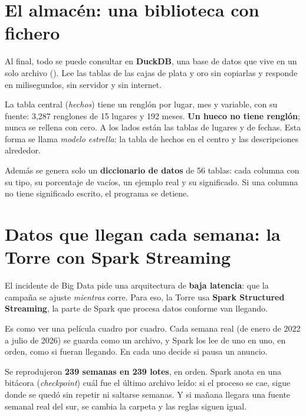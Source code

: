 \section{El almacén: una biblioteca con fichero}
Al final, todo se puede consultar en \textbf{DuckDB}, una base de datos que vive en un solo archivo
(). Lee las tablas de las cajas de plata y oro sin copiarlas y responde en milisegundos,
sin servidor y sin internet.

La tabla central (\emph{hechos}) tiene un renglón por lugar, mes y variable, con su fuente: 3,287 renglones de 15 lugares
y 192 meses. \textbf{Un hueco no tiene renglón}; nunca se rellena con cero. A los lados están las tablas de lugares y de
fechas. Esta forma se llama \emph{modelo estrella}: la tabla de hechos en el centro y las descripciones alrededor.

Además se genera solo un \textbf{diccionario de datos} de 56 tablas: cada columna con su tipo, su porcentaje de vacíos, un
ejemplo real y su significado. Si una columna no tiene significado escrito, el programa se detiene.

\section{Datos que llegan cada semana: la Torre con Spark Streaming}
El incidente de Big Data pide una arquitectura de \textbf{baja latencia}: que la campaña se ajuste \emph{mientras} corre.
Para eso, la Torre usa \textbf{Spark Structured Streaming}, la parte de Spark que procesa datos conforme van llegando.

\begin{intuicion}
Es como ver una película cuadro por cuadro. Cada semana real (de enero de 2022 a julio de 2026) se guarda como un archivo,
y Spark los lee de uno en uno, en orden, como si fueran llegando. En cada uno decide si pausa un anuncio.
\end{intuicion}
Se reprodujeron \textbf{239 semanas en 239 lotes}, en orden. Spark anota en una bitácora (\emph{checkpoint}) cuál fue el
último archivo leído: si el proceso se cae, sigue donde se quedó sin repetir ni saltarse semanas. Y si mañana llegara una
fuente semanal real del sur, se cambia la carpeta y las reglas siguen igual.
